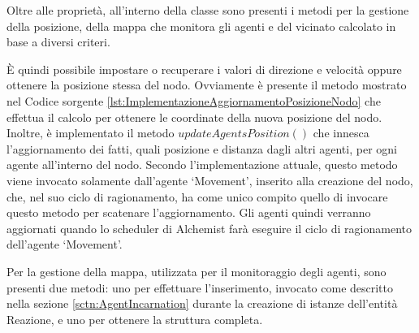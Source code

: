 Oltre alle proprietà, all'interno della classe sono presenti i metodi per la gestione della posizione, della mappa che monitora gli agenti e del vicinato calcolato in base a diversi criteri.

\`E quindi possibile impostare o recuperare i valori di direzione e velocità oppure ottenere la posizione stessa del nodo. Ovviamente è presente il metodo mostrato nel Codice sorgente \ref{lst:ImplementazioneAggiornamentoPosizioneNodo} che effettua il calcolo per ottenere le coordinate della nuova posizione del nodo.
Inoltre, è implementato il metodo $updateAgentsPosition()$ che innesca l'aggiornamento dei fatti, quali posizione e distanza dagli altri agenti, per ogni agente all'interno del nodo. Secondo l'implementazione attuale, questo metodo viene invocato solamente dall'agente `Movement', inserito alla creazione del nodo, che, nel suo ciclo di ragionamento, ha come unico compito quello di invocare questo metodo per scatenare l'aggiornamento. Gli agenti quindi verranno aggiornati quando lo scheduler di Alchemist farà eseguire il ciclo di ragionamento dell'agente `Movement'.

Per la gestione della mappa, utilizzata per il monitoraggio degli agenti, sono presenti due metodi: uno per effettuare l'inserimento, invocato come descritto nella sezione \ref{sctn:AgentIncarnation} durante la creazione di istanze dell'entità Reazione, e uno per ottenere la struttura completa.

